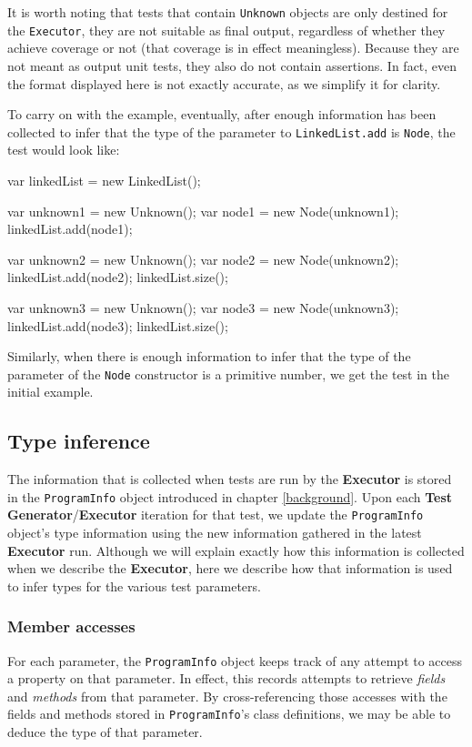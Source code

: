 It is worth noting that tests that contain \texttt{Unknown} objects are only destined for the \texttt{Executor}, they are not suitable as final output, regardless of whether they achieve coverage or not (that coverage is in effect meaningless). Because they are not meant as output unit tests, they also do not contain assertions. In fact, even the format displayed here is not exactly accurate, as we simplify it for clarity.

To carry on with the example, eventually, after enough information has been collected to infer that the type of the parameter to \texttt{LinkedList.add} is \texttt{Node}, the test would look like:

\begin{verbcode}
   var linkedList = new LinkedList();
   
   var unknown1 = new Unknown();
   var node1 = new Node(unknown1);
   linkedList.add(node1);
   
   var unknown2 = new Unknown();
   var node2 = new Node(unknown2);
   linkedList.add(node2);
   linkedList.size();

   var unknown3 = new Unknown();
   var node3 = new Node(unknown3);
   linkedList.add(node3);
   linkedList.size();
\end{verbcode}

Similarly, when there is enough information to infer that the type of the parameter of the \texttt{Node} constructor is a primitive number, we get the test in the initial example.

\subsection{Type inference}
The information that is collected when tests are run by the \textbf{Executor} is stored in the \texttt{ProgramInfo} object introduced in chapter \ref{background}. Upon each \textbf{Test Generator}/\textbf{Executor} iteration for that test, we update the \texttt{ProgramInfo} object's type information using the new information gathered in the latest \textbf{Executor} run. Although we will explain exactly how this information is collected when we describe the \textbf{Executor}, here we describe how that information is used to infer types for the various test parameters.

\subsubsection{Member accesses}
For each parameter, the \texttt{ProgramInfo} object keeps track of any attempt to access a property on that parameter. In effect, this records attempts to retrieve \emph{fields} and \emph{methods} from that parameter. By cross-referencing those accesses with the fields and methods stored in \texttt{ProgramInfo}'s class definitions, we may be able to deduce the type of that parameter. 

